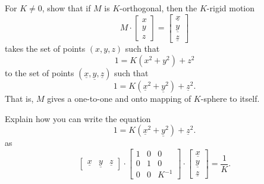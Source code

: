 \documentclass[newpage,hints,handout,noauthor,nooutcomes,12pt]{ximera}
\begin{document}
\begin{problem}
  For $K\ne 0$, show that if $M$ is $K$-orthogonal, then the $K$-rigid motion
  \[
  M \cdot
  \begin{bmatrix}
    x \\ y \\ z
  \end{bmatrix}=
  \begin{bmatrix}
    \underline{x} \\ \underline{y} \\ \underline{z}
  \end{bmatrix}
  \]
  takes the set of points $(x,y,z)$ such that
  \[
  1 = K\left(x^2 + y^2\right) +z^2
  \]
  to the set of points $(\underline{x},\underline{y},\underline{z})$ such that
  \[
  1=K\left(\underline{x}^2 + \underline{y}^{2}\right) + \underline{z}^{2}.
  \]
  That is, $M$ gives a one-to-one and onto mapping of $K$-sphere to
  itself.
\begin{hint}
  Explain how you can write the equation
  \[
  1=K\left(\underline{x}^2 + \underline{y}^{2}\right) + \underline{z}^{2}.
  \]
  as
\[
\begin{bmatrix}
\underline{x} & \underline{y} & \underline{z}%
\end{bmatrix}  \cdot\begin{bmatrix}
1 & 0 & 0\\
0 & 1 & 0\\
0 & 0 & K^{-1}%
\end{bmatrix}  \cdot
\begin{bmatrix}
\underline{x}\\
\underline{y}\\
\underline{z}%
\end{bmatrix}  =\frac{1}{K}.
\]
\end{hint}


\end{problem}
\end{document}
